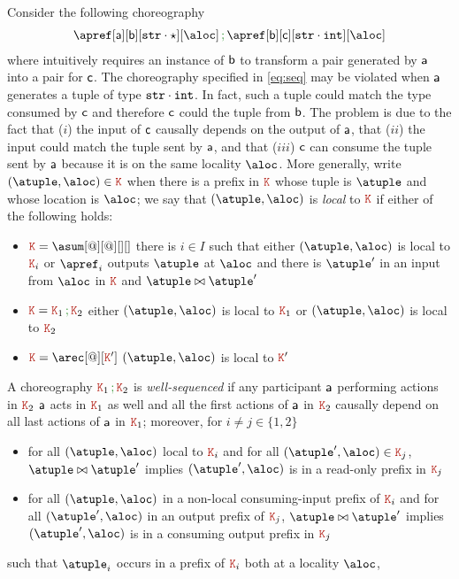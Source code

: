 Consider the following choreography
\begin{align}\label{eq:seq}
  \apref[\ptp a][\ptp b][{\asort[str] \cdot \wildcard}][\aloc] \seqop \apref[\ptp b][\ptp c][{\asort[str] \cdot \asort[int]}][\aloc]
\end{align}
%
where intuitively requires an instance of $\ptp b$ to transform a pair
generated by $\ptp a$ into a pair for $\ptp c$.
%
The choreography specified in \eqref{eq:seq} may be violated when
$\ptp a$ generates a tuple of type $\asort[str] \cdot \asort[int]$.
%
In fact, such a tuple could match the type consumed by $\ptp c$ and
therefore $\ptp c$ could  the tuple from $\ptp b$.
%
The problem is due to the fact that ($i$) the input of $\ptp c$
causally depends on the output of $\ptp a$, that ($ii$) the input
could match the tuple sent by $\ptp a$, and that ($iii$) $\ptp c$
can consume the tuple sent by $\ptp a$ because it is on the same
locality $\aloc$.
%
More generally, write $(\atuple, \aloc) \in \aK$ when there is a
prefix in $\aK$ whose tuple is $\atuple$ and whose location is
$\aloc$; we say that $(\atuple, \aloc)$ is \emph{local} to $\aK$ if
either of the following holds:
\begin{itemize}
\item $\aK = \asum[@][@][][]$ there is $i \in I$ such that either
  $(\atuple, \aloc)$ is local to $\aK_i$ or $\apref_i$ outputs
  $\atuple$ at $\aloc$ and there is $\atuple'$ in an input from
  $\aloc$ in $\aK$ and $\atuple \matches \atuple'$
\item $\aK = \aK_1 \seqop \aK_2$ either $(\atuple, \aloc)$ is local to
  $\aK_1$ or   $(\atuple, \aloc)$ is local to $\aK_2$
\item $\aK = \arec[@][\aK']$ $(\atuple, \aloc)$ is local to $\aK'$
\end{itemize}
%
A choreography $\aK_1 \seqop \aK_2$ is \emph{well-sequenced} if any
participant $\ptp a$ performing actions in $\aK_2$ $\ptp a$ acts in
$\aK_1$ as well and all the first actions of $\ptp a$ in $\aK_2$
causally depend on all last actions of $\ptp a$ in $\aK_1$; moreover,
for $i \neq j \in \{1,2\}$
%
\begin{itemize}
\item for all $(\atuple,\aloc)$ local to $\aK_i$ and for all
  $(\atuple', \aloc) \in \aK_j$, $\atuple \matches \atuple'$ implies
  $(\atuple', \aloc)$ is in a read-only prefix in $\aK_j$
\item for all $(\atuple,\aloc)$ in a non-local consuming-input prefix
  of $\aK_i$ and for all $(\atuple', \aloc)$ in an output prefix of
  $\aK_j$, $\atuple \matches \atuple'$ implies $(\atuple',\aloc)$ is
  in a consuming output prefix in $\aK_j$
  
\end{itemize}
such that $\atuple_i$ occurs in a prefix of
$\aK_i$ both at a locality $\aloc$,

